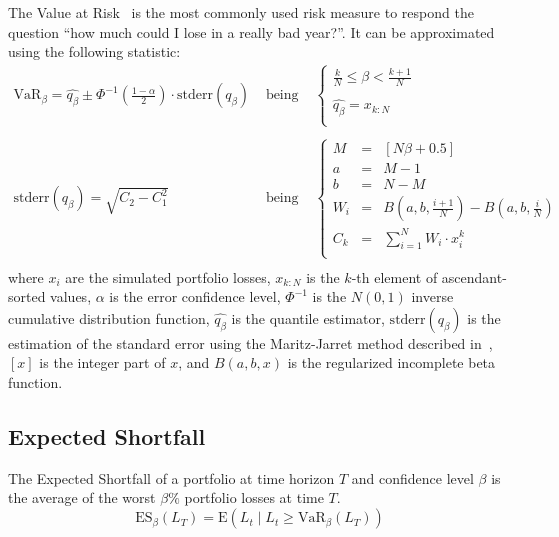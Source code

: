 \documentclass[11pt,fleqn]{book} %
\begin{document}
The Value at Risk~\cite{var:jorion} is the most commonly 
used risk measure to respond the question \enquote{how much could I lose in a 
really bad year?}. It can be approximated using the following statistic:
\begin{displaymath}
	\begin{array}{lcl}
		\textrm{VaR}_{\beta} = \widehat{q_{\beta}} \pm \Phi^{-1}\left(\frac{1-\alpha}{2}\right) \cdot \textrm{stderr}(q_{\beta})
		& \text{ being } &
		\left\{
		\begin{array}{l}
			\displaystyle
			\frac{k}{N} \leq \beta < \frac{k+1}{N} \\
			\\
			\displaystyle
			\widehat{q_{\beta}} = x_{k:N} \\
		\end{array}
		\right.
		\\
		& &
		\\
		\textrm{stderr}(q_{\beta}) = \sqrt{C_2 - C_1^2}
		& \text{ being } &
		\left\{
		\begin{array}{rcl}
			M   & = & [N \beta + 0.5]  \\
			a   & = & M - 1            \\
			b   & = & N - M            \\
			W_i & = & B(a,b,\frac{i+1}{N}) - B(a,b,\frac{i}{N}) \\
			C_k & = & \sum_{i=1}^{N} W_i \cdot x_i^k \\
		\end{array}
		\right.
		\\
	\end{array}
\end{displaymath}
where $x_i$ are the simulated portfolio losses, $x_{k:N}$ is the $k$-th 
element of ascendant-sorted values, $\alpha$ is the error confidence level, 
$\Phi^{-1}$ is the $N(0,1)$ inverse cumulative distribution function, 
$\widehat{q_{\beta}}$ is the quantile estimator, $\textrm{stderr}(q_{\beta})$ 
is the estimation of the standard error using the Maritz-Jarret method 
described in~\cite{quant:algor}, $[x]$ is the integer part of $x$, and 
$B(a,b,x)$ is the regularized incomplete beta function.

\subsection{Expected Shortfall}

\begin{definition}
	The Expected Shortfall of a portfolio at time horizon $T$ and 
	confidence level $\beta$ is the average of the worst $\beta\%$ portfolio 
	losses at time $T$.
	\begin{displaymath}
		\text{ES}_\beta(L_T) = \text{E}(L_t \mid L_t \ge \text{VaR}_\beta(L_T))
	\end{displaymath}
\end{definition}
\end{document}
